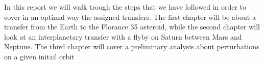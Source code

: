 In this report we will walk trough the steps that we have followed in order to cover in an optimal way the assigned transfers.
The first chapter will be about a transfer from the Earth to the Florance 35 asteroid, while the second chapter will look at an interplanetary transfer with a flyby on Saturn between Mars and Neptune. The third chapter will cover a preliminary analysis about perturbations on a given initail orbit
